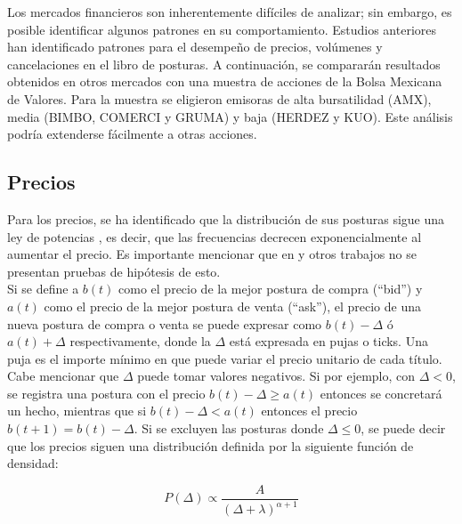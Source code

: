 \documentclass[11pt]{article}
\numberwithin{equation}{section} %
\begin{document}
Los mercados financieros son inherentemente difíciles de analizar; sin embargo, es posible identificar algunos patrones en su comportamiento. Estudios anteriores \cite{Bouchaud2002,zovko2002power,marketsdigest} han identificado patrones para el desempeño de precios, volúmenes y cancelaciones en el libro de posturas. A continuación, se compararán resultados obtenidos en otros mercados con una muestra de acciones de la Bolsa Mexicana de Valores. Para la muestra se eligieron emisoras de alta bursatilidad (AMX), media (BIMBO, COMERCI y GRUMA) y baja (HERDEZ y KUO). Este análisis podría extenderse fácilmente a otras acciones.\\

\subsection{Precios}

Para los precios, se ha identificado que la distribución de sus posturas sigue una ley de potencias \cite{Bouchaud2002}, es decir, que las frecuencias decrecen exponencialmente al aumentar el precio. Es importante mencionar que en \cite{Bouchaud2002} y otros trabajos no se presentan pruebas de hipótesis de esto.\\

Si se define a $b(t)$ como el precio de la mejor postura de compra (``bid'') y $a(t)$ como el precio de la mejor postura de venta (``ask''), el precio de una nueva postura de compra o venta se puede expresar como $b(t)-\Delta$ ó $a(t)+\Delta$ respectivamente, donde la $\Delta$ está expresada en pujas o ticks. Una puja es el importe mínimo en que puede variar el precio unitario de cada título. Cabe mencionar que $\Delta$ puede tomar valores negativos. Si por ejemplo, con $\Delta <0$, se registra una postura con el precio $b(t)-\Delta \geq a(t)$ entonces se concretará un hecho, mientras que si $b(t)-\Delta < a(t)$ entonces el precio $b(t+1)=b(t)-\Delta$. Si se excluyen las posturas donde $\Delta \leq 0$, se puede decir que los precios siguen una distribución definida por la siguiente función de densidad:

\begin{equation}
P\left(\Delta\right) \propto \frac{A}{{\left(\Delta+\lambda\right)}^{\alpha+1}}
\end{equation}
\end{document}
